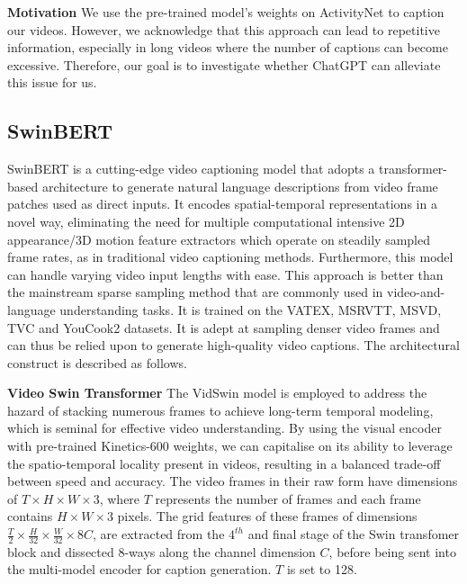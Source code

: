 \textbf{Motivation}
We use the pre-trained model's weights on ActivityNet to caption our videos. However, we acknowledge that this approach can lead to repetitive information, especially in long videos where the number of captions can become excessive. Therefore, our goal is to investigate whether ChatGPT can alleviate this issue for us.

\subsection{SwinBERT}
SwinBERT \cite{lin2022swinbert} is a cutting-edge video captioning model that adopts a transformer-based architecture to generate natural language descriptions from video frame patches used as direct inputs. It encodes spatial-temporal representations in a novel way, eliminating the need for multiple computational intensive 2D appearance/3D motion feature extractors which operate on steadily sampled frame rates, as in traditional video captioning methods. Furthermore, this model can handle varying video input lengths with ease. This approach is better than the mainstream sparse sampling method that are commonly used in video-and-language understanding tasks. It is trained on the VATEX, MSRVTT, MSVD, TVC and YouCook2 datasets. It is adept at sampling denser video frames and can thus be relied upon to generate high-quality video captions. The architectural construct is described as follows.

\textbf{Video Swin Transformer} The VidSwin \cite{Liu2021VideoST} model is employed to address the hazard of stacking numerous frames to achieve long-term temporal modeling, which is seminal for effective video understanding. By using the visual encoder with pre-trained Kinetics-600 weights, we can capitalise on its ability to leverage the spatio-temporal locality present in videos, resulting in a balanced trade-off between speed and accuracy. The video frames in their raw form have dimensions of $T \times H \times W \times 3$, where $T$ represents the number of frames and each frame contains $H \times W \times 3$ pixels. The grid features of these frames of dimensions $\frac{T}{2} \times \frac{H}{32} \times \frac{W}{32} \times 8C$, are extracted from the $4^{th}$ and final stage of the Swin transfomer block and dissected 8-ways along the channel dimension $C$, before being sent into the multi-model encoder for caption generation. $T$ is set to 128.

